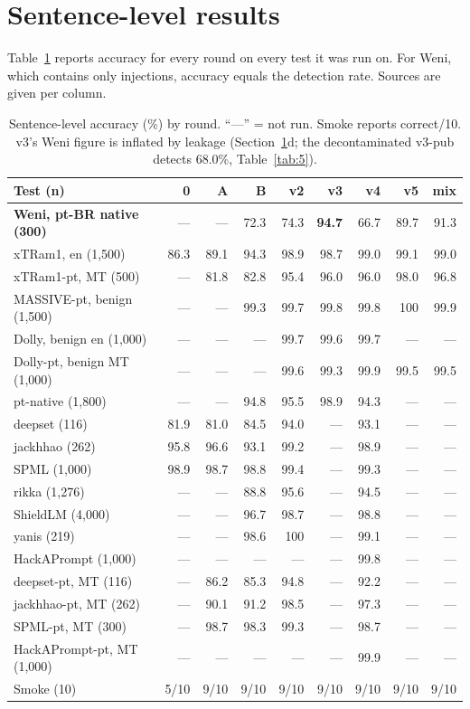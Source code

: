 \documentclass[11pt]{article}
\begin{document}
\section{Sentence-level results}\label{sec:4}

Table~\ref{tab:4} reports accuracy for every round on every test it was run on. For Weni, which contains only injections, accuracy equals the detection rate. Sources are given per column.

\begin{table}[tbp]
\centering
\small
\caption{Sentence-level accuracy (\%) by round. ``—'' = not run. Smoke reports correct/10. v3's Weni figure is inflated by leakage (Section~\ref{sec:4}d; the decontaminated v3-pub detects 68.0\%, Table~\ref{tab:5}).}\label{tab:4}
\begin{tabular}{@{}lrrrrrrrr@{}}
\toprule
Test (n) & 0 %
 & A %
 & B %
 & v2 %
 & v3 %
 & v4 %
 & v5 %
 & mix %
 \\
\midrule
\textbf{Weni, pt-BR native (300)} & — & — & 72.3 & 74.3 & \textbf{94.7} & 66.7 & 89.7 & 91.3 \\
xTRam1, en (1,500) & 86.3 & 89.1 & 94.3 & 98.9 & 98.7 & 99.0 & 99.1 & 99.0 \\
xTRam1-pt, MT (500) & — & 81.8 & 82.8 & 95.4 & 96.0 & 96.0 & 98.0 & 96.8 \\
MASSIVE-pt, benign (1,500) & — & — & 99.3 & 99.7 & 99.8 & 99.8 & 100 & 99.9 \\
Dolly, benign en (1,000) & — & — & — & 99.7 & 99.6 & 99.7 & — & — \\
Dolly-pt, benign MT (1,000) & — & — & — & 99.6 & 99.3 & 99.9 & 99.5 & 99.5 \\
pt-native (1,800) & — & — & 94.8 & 95.5 & 98.9 & 94.3 & — & — \\
deepset (116) & 81.9 & 81.0 & 84.5 & 94.0 & — & 93.1 & — & — \\
jackhhao (262) & 95.8 & 96.6 & 93.1 & 99.2 & — & 98.9 & — & — \\
SPML (1,000) & 98.9 & 98.7 & 98.8 & 99.4 & — & 99.3 & — & — \\
rikka (1,276) & — & — & 88.8 & 95.6 & — & 94.5 & — & — \\
ShieldLM (4,000) & — & — & 96.7 & 98.7 & — & 98.8 & — & — \\
yanis (219) & — & — & 98.6 & 100 & — & 99.1 & — & — \\
HackAPrompt (1,000) & — & — & — & — & — & 99.8 & — & — \\
deepset-pt, MT (116) & — & 86.2 & 85.3 & 94.8 & — & 92.2 & — & — \\
jackhhao-pt, MT (262) & — & 90.1 & 91.2 & 98.5 & — & 97.3 & — & — \\
SPML-pt, MT (300) & — & 98.7 & 98.3 & 99.3 & — & 98.7 & — & — \\
HackAPrompt-pt, MT (1,000) & — & — & — & — & — & 99.9 & — & — \\
Smoke (10) & 5/10 & 9/10 & 9/10 & 9/10 & 9/10 & 9/10 & 9/10 & 9/10 \\
\bottomrule
\end{tabular}
\end{table}
\end{document}
